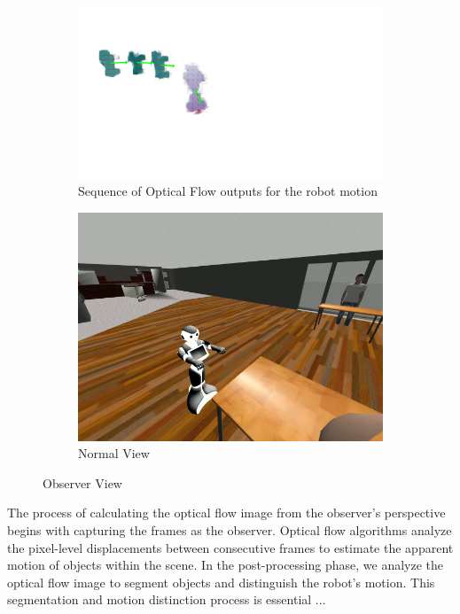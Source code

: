 \begin{figure}[ht]
  \centering
  \begin{subfigure}{0.5\textwidth}
    \includegraphics[width=\linewidth]{figs/Pepper-optical-flow.png}
    \caption{Sequence of Optical Flow outputs for the robot motion}
    \label{fig:sub1}
  \end{subfigure}
  \hspace{0.05\textwidth}
  \begin{subfigure}{0.35\textwidth}
    \includegraphics[width=\linewidth]{figs/legibot-pepper-restaurant.png}
    \caption{Normal View}
    \label{fig:sub2}
  \end{subfigure}
  \caption{Observer View}
  \label{fig:main}
\end{figure}

The process of calculating the optical flow image from the observer's perspective begins with capturing the frames as the observer. Optical flow algorithms analyze the pixel-level displacements between consecutive frames to estimate the apparent motion of objects within the scene. In the post-processing phase, we analyze the optical flow image to segment objects and distinguish the robot's motion. This segmentation and motion distinction process is essential ...

